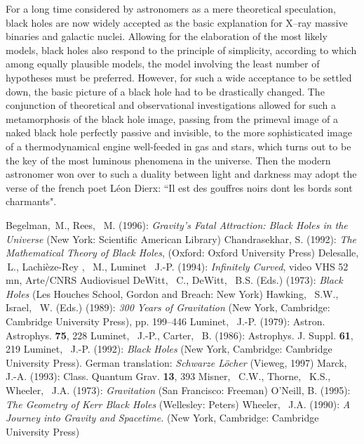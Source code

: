 \documentclass{lamuphys}
\begin{document}
For a long time considered by astronomers as a mere theoretical speculation,
black holes are now
widely accepted as the basic explanation for X--ray massive binaries and galactic nuclei.
Allowing for the elaboration of the most likely models, black holes also respond to the
principle of simplicity, according to which among equally plausible 
models, the model involving the least number of hypotheses must be preferred. 
However, for such a wide acceptance to be settled down, the basic picture of a black hole
had to be drastically changed. The conjunction of theoretical and 
observational investigations
allowed for such a metamorphosis of the black hole image, passing from the primeval image of 
a naked black hole perfectly
passive and invisible, to the more sophisticated image of a thermodynamical engine well-feeded 
in gas and stars, which turns out to be the key of the most
luminous phenomena in the universe.
Then the modern astronomer won over to such a duality
between light and darkness may adopt the verse of the french poet L\'eon
Dierx: ``Il est des gouffres noirs dont les bords sont charmants".
 
%
%
\begin{thebibliography}{22}
%
%
 Begelman, \,M., Rees, \, M. (1996): {\it Gravity's Fatal Attraction: Black Holes 
in the Universe} 
(New York: Scientific American Library)
%
 Chandrasekhar, S. (1992): {\it The Mathematical Theory of Black 
Holes}, (Oxford: Oxford University Press)
%
 Delesalle, \,L., Lachi\`eze-Rey , \, M., Luminet \, 
J.-P. (1994): {\it Infinitely Curved}, video VHS 52 mn, Arte/CNRS Audiovisuel
%
 DeWitt, \, C., DeWitt, \, B.S. (Eds.) (1973): {\it Black Holes} (Les Houches 
School, Gordon and Breach: New York)
%
 Hawking, \, S.W., Israel, \, W. (Eds.) (1989): {\it 300 Years 
of Gravitation} 
(New York, Cambridge: Cambridge University Press), pp. 199--446
%
 Luminet, \, J.-P. (1979): Astron. Astrophys. {\bf 
75}, 228
%
 Luminet, \, J.-P., Carter, \, B. (1986): Astrophys. J. Suppl. 
{\bf 61}, 219
%
 Luminet, \, J.-P. (1992): {\it Black Holes} 
(New York, Cambridge: Cambridge University Press). German 
translation: {\it Schwarze L\"ocher} (Vieweg, 1997)
%
 Marck, \, J.-A. (1993): Class. Quantum Grav. {\bf 13}, 
393
%
 Misner, \, C.W., Thorne, \, K.S., Wheeler, \, J.A. (1973): 
{\it Gravitation} 
(San Francisco: Freeman)
%
 O'Neill, B. (1995): {\it The Geometry of Kerr Black Holes} 
(Wellesley: Peters)
%
 Wheeler, \, J.A. (1990): {\it A Journey into Gravity and 
Spacetime.} 
(New York, Cambridge: Cambridge University Press)
\end{thebibliography}
\end{document}

